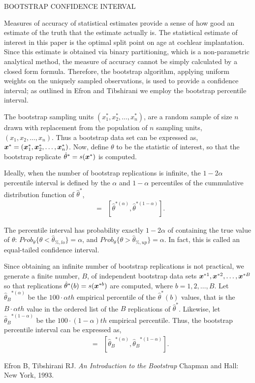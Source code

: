 \documentclass{article}
\def\bx{{{\bf \mbox{\boldmath $x$}}}}
\def\thetahatstar{{\hat{\theta}}^{*}}
\def\thetahatstaralpha{{\hat{\theta}}^{*(\alpha)}}
\def\thetahatstaraalpha{{\hat{\theta}}^{*(1-\alpha)}}
\def\thetahatBstaralpha{{\hat{\theta}_{B}}^{*(\alpha)}}
\def\thetahatBstaraalpha{{\hat{\theta}_{B}}^{*(1-\alpha)}}
\def\thetahatpctlo{{\hat{\theta}}_{\%,lo}}
\def\thetahatpctup{{\hat{\theta}}_{\%,up}}
\begin{document}
\begin{center}
{\huge BOOTSTRAP CONFIDENCE INTERVAL\\}
\end{center}
\vspace{1cm}

Measures of accuracy of statistical estimates provide a sense of how good an estimate 
of the truth that the estimate actually is.  The statistical estimate of interest
in this paper is the optimal split point on age at cochlear implantation.  Since this 
estimate is obtained via binary partitioning, which is a non-parametric analytical method,
the measure of accuracy cannot be simply calculated by a closed form formula.  Therefore, 
the bootstrap algorithm, applying uniform weights on the uniquely sampled observations, 
is used to provide a confidence interval; as outlined in Efron and Tibshirani \cite{ET93} 
we employ the bootstrap percentile interval.

The bootstrap sampling units $(x^{*}_{1}, x^{*}_{2}, \ldots , x^{*}_{n})$, are a random
sample of size $n$ drawn with replacement from the population of $n$ sampling units, 
$(x_{1}, x_{2}, \ldots , x_{n})$.  Thus a bootstrap data set can be expressed as,
$\bx^{*} = (\bx^{*}_{1}, \bx^{*}_{2}, \ldots , \bx^{*}_{n})$.  Now, define $\theta$ to be the 
statistic of interest, so that the bootstrap replicate $\thetahatstar = s(\bx^{*})$ is 
computed.

Ideally, when the number of bootstrap replications is infinite, the $1-2\alpha$ percentile interval 
is defined by the $\alpha$ and $1-\alpha$ percentiles of the cummulative distribution function of 
$\thetahatstar$,
\begin{eqnarray*}
[ \thetahatpctlo , \thetahatpctup ] & = & [ \thetahatstaralpha , \thetahatstaraalpha ].
\end{eqnarray*}

The percentile interval has probability exactly $1-2\alpha$ of containing the true value of $\theta$: $Prob_{\theta} \{ \theta < \thetahatpctlo \} = \alpha$, and
$Prob_{\theta} \{ \theta > \thetahatpctup \} = \alpha$.  In fact, this is called an equal-tailed
confidence interval.

Since obtaining an infinite number of bootstrap replications is not practical, we generate a finite number, $B$, of independent bootstrap data sets $\bx^{*1}, \bx^{*2}, \ldots , \bx^{*B}$ so that replications $\thetahatstar (b) = s(\bx^{*b})$ are computed, where $b=1,2, \ldots , B$.  Let $\thetahatBstaralpha$ be the $100 \cdot \alpha th$ empirical percentile of the $\thetahatstar (b)$ values, that is the $B \cdot \alpha th$ value in the ordered list of the $B$ replications of $\thetahatstar$.  Likewise, let $\thetahatBstaraalpha$ be the $100 \cdot (1-\alpha) th$ empirical percentile.  Thus, the bootstrap percentile interval can be expressed as,
\begin{eqnarray*}
[ \thetahatpctlo , \thetahatpctup ] & = & [ \thetahatBstaralpha , \thetahatBstaraalpha ].
\end{eqnarray*}
\begin{thebibliography}{99}
Efron B, Tibshirani RJ.
\textit{An Introduction to the Bootstrap}
Chapman and Hall: New York, 1993.
\end{thebibliography}
\end{document}
